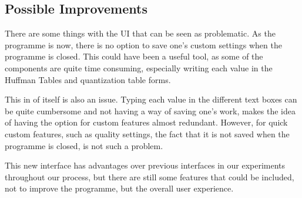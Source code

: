 \subsection{Possible Improvements}
There are some things with the UI that can be seen as problematic.
As the programme is now, there is no option to save one's custom settings when the programme is closed.
This could have been a useful tool, as some of the components are quite time consuming, especially writing each value in the Huffman Tables and quantization table forms.

This in of itself is also an issue.
Typing each value in the different text boxes can be quite cumbersome and not having a way of saving one's work, makes the idea of having the option for custom features almost redundant.
However, for quick custom features, such as quality settings, the fact that it is not saved when the programme is closed, is not such a problem.

This new interface has advantages over previous interfaces in our experiments throughout our process, but there are still some features that could be included, not to improve the programme, but the overall user experience.


